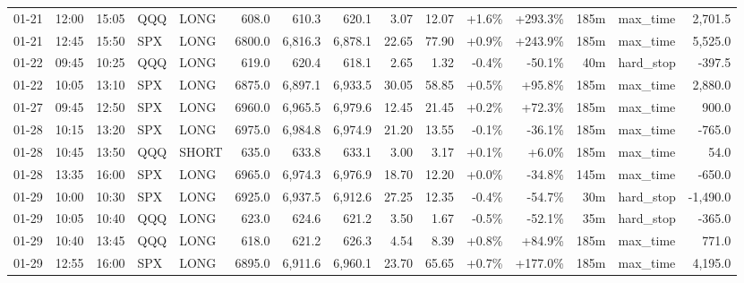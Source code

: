\documentclass[11pt,a4paper,twoside]{article}
\begin{document}
\begin{landscape}
\begin{center}
\begin{longtable}{>{\color{txtmain}}l l l l l r r r r r r r r >{\color{txtmain}}l r}
01-21 & 12:00 & 15:05 & QQQ & LONG & 608.0 & 610.3 & 620.1 & 3.07 & 12.07 & \textcolor{wingreen}{+1.6\%} & \textcolor{wingreen}{+293.3\%} & 185m & max\_time & \textcolor{wingreen}{2,701.5} \\
01-21 & 12:45 & 15:50 & SPX & LONG & 6800.0 & 6,816.3 & 6,878.1 & 22.65 & 77.90 & \textcolor{wingreen}{+0.9\%} & \textcolor{wingreen}{+243.9\%} & 185m & max\_time & \textcolor{wingreen}{5,525.0} \\
01-22 & 09:45 & 10:25 & QQQ & LONG & 619.0 & 620.4 & 618.1 & 2.65 & 1.32 & \textcolor{lossred}{-0.4\%} & \textcolor{lossred}{-50.1\%} & 40m & hard\_stop & \textcolor{lossred}{-397.5} \\
01-22 & 10:05 & 13:10 & SPX & LONG & 6875.0 & 6,897.1 & 6,933.5 & 30.05 & 58.85 & \textcolor{wingreen}{+0.5\%} & \textcolor{wingreen}{+95.8\%} & 185m & max\_time & \textcolor{wingreen}{2,880.0} \\
01-27 & 09:45 & 12:50 & SPX & LONG & 6960.0 & 6,965.5 & 6,979.6 & 12.45 & 21.45 & \textcolor{wingreen}{+0.2\%} & \textcolor{wingreen}{+72.3\%} & 185m & max\_time & \textcolor{wingreen}{900.0} \\
01-28 & 10:15 & 13:20 & SPX & LONG & 6975.0 & 6,984.8 & 6,974.9 & 21.20 & 13.55 & \textcolor{lossred}{-0.1\%} & \textcolor{lossred}{-36.1\%} & 185m & max\_time & \textcolor{lossred}{-765.0} \\
01-28 & 10:45 & 13:50 & QQQ & SHORT & 635.0 & 633.8 & 633.1 & 3.00 & 3.17 & \textcolor{wingreen}{+0.1\%} & \textcolor{wingreen}{+6.0\%} & 185m & max\_time & \textcolor{wingreen}{54.0} \\
01-28 & 13:35 & 16:00 & SPX & LONG & 6965.0 & 6,974.3 & 6,976.9 & 18.70 & 12.20 & \textcolor{wingreen}{+0.0\%} & \textcolor{lossred}{-34.8\%} & 145m & max\_time & \textcolor{lossred}{-650.0} \\
01-29 & 10:00 & 10:30 & SPX & LONG & 6925.0 & 6,937.5 & 6,912.6 & 27.25 & 12.35 & \textcolor{lossred}{-0.4\%} & \textcolor{lossred}{-54.7\%} & 30m & hard\_stop & \textcolor{lossred}{-1,490.0} \\
01-29 & 10:05 & 10:40 & QQQ & LONG & 623.0 & 624.6 & 621.2 & 3.50 & 1.67 & \textcolor{lossred}{-0.5\%} & \textcolor{lossred}{-52.1\%} & 35m & hard\_stop & \textcolor{lossred}{-365.0} \\
01-29 & 10:40 & 13:45 & QQQ & LONG & 618.0 & 621.2 & 626.3 & 4.54 & 8.39 & \textcolor{wingreen}{+0.8\%} & \textcolor{wingreen}{+84.9\%} & 185m & max\_time & \textcolor{wingreen}{771.0} \\
01-29 & 12:55 & 16:00 & SPX & LONG & 6895.0 & 6,911.6 & 6,960.1 & 23.70 & 65.65 & \textcolor{wingreen}{+0.7\%} & \textcolor{wingreen}{+177.0\%} & 185m & max\_time & \textcolor{wingreen}{4,195.0} \\

\end{longtable}
\end{center}
\end{landscape}
\end{document}
